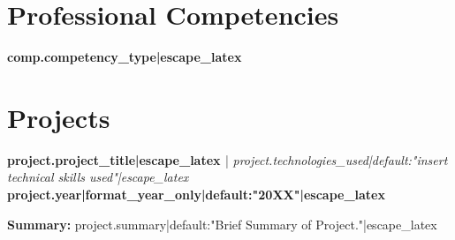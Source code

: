 \documentclass[11pt,letterpaper]{article}
\begin{document}
{{{{{{{{{{{{{{{{{{%
{%


{%
\section{Professional Competencies}

{%
\noindent\textbf{ {{ comp.competency_type|escape_latex }} } \\
\vspace{-6pt}
\begin{itemize}[leftmargin=15pt,itemsep=1pt,parsep=0pt,topsep=2pt]
{%
{%
{%
\end{itemize}
\vspace{4pt}

{%
{%


{%
\section{Projects}

{%
{%
\noindent\textbf{ {{ project.project_title|escape_latex }} } | \textit{ {{ project.technologies_used|default:"insert technical skills used"|escape_latex }} } \hfill \textbf{ {{ project.year|format_year_only|default:"20XX"|escape_latex }} } \\
{%
\textbf{Summary:} {{ project.summary|default:"Brief Summary of Project."|escape_latex }} \\
{%
\vspace{-6pt}
\vspace{4pt}
{%
{%
{%

}}}}}}}}}}}}}}}}}}}}}}}}}}}}}}}
\end{document}

